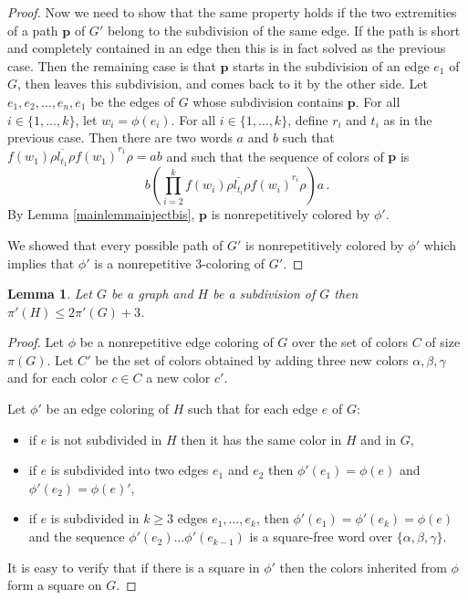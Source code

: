 \documentclass[a4paper,12pt]{article}
\newtheorem{lemma}{Lemma}
\newcommand{\pal}{\rho}
\begin{document}
\begin{proof}
Now we need to show that the same property holds if the two extremities of a path $\mathbf{p}$ of $G'$ belong to the subdivision of the same edge. If the path is short and completely contained in an edge then this is in fact solved as the previous case. Then the remaining case is that 
$\mathbf{p}$ starts in the subdivision of an edge $e_1$ of $G$, then leaves this subdivision, and comes back to it by the other side. Let $e_1,e_2,\ldots, e_n, e_1$ be the edges of $G$ whose subdivision contains $\mathbf{p}$.
For all $i\in\{1,\ldots, k\}$, let $w_i=\phi(e_i)$. For all $i\in\{1,\ldots, k\}$, define $r_i$ and $t_i$ as in the previous case. Then there are two words $a$ and $b$ such that $\overline {f(w_1)\pal l_{t_1}\pal f(w_1)}^{r_1}\pal = ab$ and such that the sequence of colors of $\mathbf{p}$ is
$$b\left(\prod_{i=2}^k \overline {f(w_i)\pal l_{t_i}\pal f(w_i)}^{r_i}\pal \right) a\,.$$
By Lemma \ref{mainlemmainjectbis}, $\mathbf{p}$ is nonrepetitively colored by $\phi'$.

We showed that every possible path of $G'$ is nonrepetitively colored by $\phi'$ which implies that $\phi'$ is a nonrepetitive $3$-coloring of $G'$.
\end{proof}

\begin{lemma}\label{lemmasubddoesnotincreasepi}
  Let $G$ be a graph and $H$ be a subdivision of $G$ then
  $\pi'(H) \le 2\pi'(G)+3$.
\end{lemma}
\begin{proof}
  Let $\phi$ be a nonrepetitive edge coloring of $G$ over the set of colors $C$ of size $\pi(G)$.
  Let $C'$ be the set of colors obtained by adding three new colors $\alpha,\beta,\gamma$ and for each color $c\in C$ a new color $c'$.
  
  Let $\phi'$ be an edge coloring of $H$ such that for each edge $e$ of $G$:
  \begin{itemize}
    \item if $e$ is not subdivided in $H$ then it has the same color in $H$ and in $G$,
    \item if $e$ is subdivided into two edges $e_1$ and $e_2$ then $\phi'(e_1)=\phi(e)$ and $\phi'(e_2)=\phi(e)'$,
    \item if $e$ is subdivided in $k\ge3$ edges $e_1,\ldots, e_k$, then $\phi'(e_1)=\phi'(e_k)=\phi(e)$ and the sequence $\phi'(e_2)\ldots\phi'(e_{k-1})$ is a square-free word over $\{\alpha,\beta,\gamma\}$.
  \end{itemize}
It is easy to verify that if there is a square in $\phi'$ then the colors inherited from $\phi$ form a square on $G$. 
\end{proof}
\end{document}
